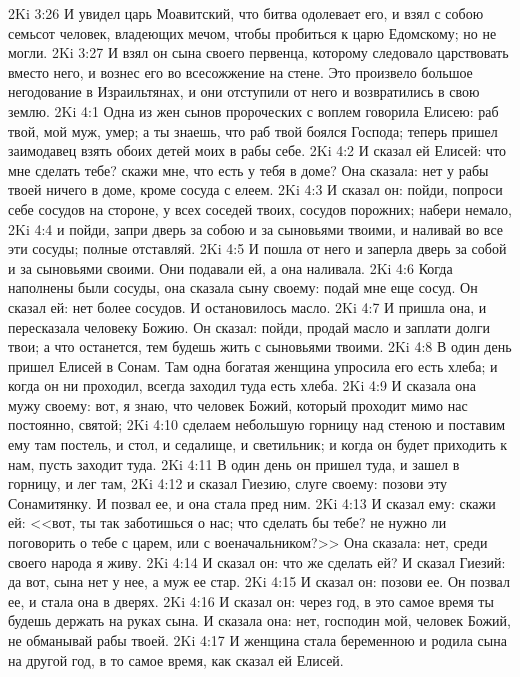\vs 2Ki 3:26 И увидел царь Моавитский, что битва одолевает его, и взял с собою семьсот человек, владеющих мечом, чтобы пробиться к царю Едомскому; но не могли.
\vs 2Ki 3:27 И взял он сына своего первенца, которому следовало царствовать вместо него, и вознес его во всесожжение на стене. Это произвело большое негодование в Израильтянах, и они отступили от него и возвратились в свою землю.
\vs 2Ki 4:1 Одна из жен сынов пророческих с воплем говорила Елисею: раб твой, мой муж, умер; а ты знаешь, что раб твой боялся Господа; теперь пришел заимодавец взять обоих детей моих в рабы себе.
\vs 2Ki 4:2 И сказал ей Елисей: что мне сделать тебе? скажи мне, что есть у тебя в доме? Она сказала: нет у рабы твоей ничего в доме, кроме сосуда с елеем.
\vs 2Ki 4:3 И сказал он: пойди, попроси себе сосудов на стороне, у всех соседей твоих, сосудов порожних; набери немало,
\vs 2Ki 4:4 и пойди, запри дверь за собою и за сыновьями твоими, и наливай во все эти сосуды; полные отставляй.
\vs 2Ki 4:5 И пошла от него и заперла дверь за собой и за сыновьями своими. Они подавали ей, а она наливала.
\vs 2Ki 4:6 Когда наполнены были сосуды, она сказала сыну своему: подай мне еще сосуд. Он сказал ей: нет более сосудов. И остановилось масло.
\vs 2Ki 4:7 И пришла она, и пересказала человеку Божию. Он сказал: пойди, продай масло и заплати долги твои; а что останется, тем будешь жить с сыновьями твоими.
\rsbpar\vs 2Ki 4:8 В один день пришел Елисей в Сонам. Там одна богатая женщина упросила его  есть хлеба; и когда он ни проходил, всегда заходил туда есть хлеба.
\vs 2Ki 4:9 И сказала она мужу своему: вот, я знаю, что человек Божий, который проходит мимо нас постоянно, святой;
\vs 2Ki 4:10 сделаем небольшую горницу над стеною и поставим ему там постель, и стол, и седалище, и светильник; и когда он будет приходить к нам, пусть заходит туда.
\vs 2Ki 4:11 В один день он пришел туда, и зашел в горницу, и лег там,
\vs 2Ki 4:12 и сказал Гиезию, слуге своему: позови эту Сонамитянку. И позвал ее, и она стала пред ним.
\vs 2Ki 4:13 И сказал ему: скажи ей: <<вот, ты так заботишься о нас; что сделать бы тебе? не нужно ли поговорить о тебе с царем, или с военачальником?>> Она сказала: нет, среди своего народа я живу.
\vs 2Ki 4:14 И сказал он: что же сделать ей? И сказал Гиезий: да вот, сына нет у нее, а муж ее стар.
\vs 2Ki 4:15 И сказал он: позови ее. Он позвал ее, и стала она в дверях.
\vs 2Ki 4:16 И сказал он: через год, в это самое время ты будешь держать на руках сына. И сказала она: нет, господин мой, человек Божий, не обманывай рабы твоей.
\vs 2Ki 4:17 И женщина стала беременною и родила сына на другой год, в то самое время, как сказал ей Елисей.
